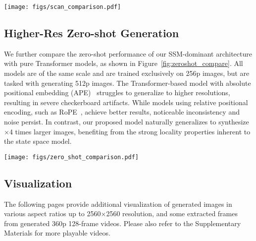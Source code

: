 \begin{figure*}[h]
  \centering
  \texttt{[image: figs/scan\_comparison.pdf]}
  \vspace{-5pt}
  \caption{Example 256$\times$256-resolution T2I generation results of different token mixers. SSMs and Hydra models are based on Mamba-2~\citep{dao2024mamba2}. The Bidirectional SSM and Hydra apply interleaved horizontal and vertical raster scans across model blocks. None of the models in this small-scale experiment is hybrid (\textit{i.e.}, all blocks use the same token mixer).}
  \label{fig:scan_compare}
\end{figure*}


\subsection{Higher-Res Zero-shot Generation}
\label{appsec:highres_zeroshot}
We further compare the zero-shot performance of our SSM-dominant architecture with pure Transformer models, as shown in Figure~\ref{fig:zeroshot_compare}. All models are of the same scale and are trained exclusively on 256p images, but are tasked with generating 512p images. The Transformer-based model with absolute positional embedding (APE)~\citep{vaswani2017attention} struggles to generalize to higher resolutions, resulting in severe checkerboard artifacts. While models using relative positional encoding, such as RoPE~\citep{su2024roformer}, achieve better results, noticeable inconsistency and noise persist. In contrast, our proposed \ours{} model naturally generalizes to synthesize $\times$4 times larger images, benefiting from the strong locality properties inherent to the state space model.

\begin{figure*}[h]
  \centering
  \texttt{[image: figs/zero\_shot\_comparison.pdf]}
  \vspace{-5pt}
  \caption{Zero-shot comparison at higher resolution. We compare our \ours{} model with the same-scale Transformer-based models (SA: Self-Attention) with Absolute Positional Embedding (APE) or Rotary Positional Embedding (RoPE). All models are trained on 256p image data and evaluated on 416$\times$608 images in a zero-shot manner.}
  \label{fig:zeroshot_compare}
\end{figure*}


\subsection{Visualization}
\label{appsec:visualization}
The following pages provide additional visualization of generated images in various aspect ratios up to 2560$\times$2560 resolution, and some extracted frames from generated 360p 128-frame videos. Please also refer to the Supplementary Materials for more playable videos.

